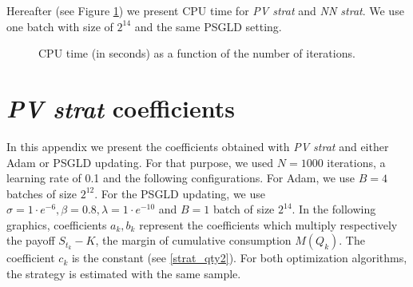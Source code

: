 \documentclass{article}
\numberwithin{equation}{section}
\begin{document}
Hereafter (see Figure \ref{cpu_time}) we present CPU time for \textit{PV strat} and \textit{NN strat}. We use one batch with size of $2^{14}$ and the same PSGLD setting.


\begin{figure}[ht!]
\centering
{}
\caption{CPU time (in seconds) as a function of the number of iterations.}
\label{cpu_time}
\end{figure}


\section{\textit{PV strat} coefficients}
\label{coeff_explicit_param}

\indent

In this appendix we present the coefficients obtained with \textit{PV strat} and either Adam or PSGLD updating. For that purpose, we used $N = 1000$ iterations, a learning rate of 0.1 and the following configurations. For Adam, we use $B = 4$ batches of size $2^{12}$. For the PSGLD updating, we use $\sigma = 1\cdot e^{-6}, \beta = 0.8, \lambda = 1\cdot e^{-10}$ and $B = 1$ batch of size $2^{14}$. In the following graphics, coefficients $a_k, b_k$ represent the coefficients which multiply respectively the payoff $S_{t_k} - K$, the margin of cumulative consumption $M(Q_k)$. The coefficient $c_k$ is the constant (see \eqref{strat_qty2}). For both optimization algorithms, the strategy is estimated with the same sample.
\end{document}

